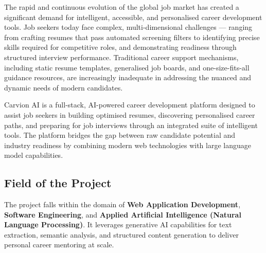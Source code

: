 \documentclass[12pt,a4paper]{article}
\begin{document}
The rapid and continuous evolution of the global job market has created a significant demand for intelligent, accessible, and personalised career development tools. Job seekers today face complex, multi-dimensional challenges --- ranging from crafting resumes that pass automated screening filters to identifying precise skills required for competitive roles, and demonstrating readiness through structured interview performance. Traditional career support mechanisms, including static resume templates, generalised job boards, and one-size-fits-all guidance resources, are increasingly inadequate in addressing the nuanced and dynamic needs of modern candidates.

Carvion AI is a full-stack, AI-powered career development platform designed to assist job seekers in building optimised resumes, discovering personalised career paths, and preparing for job interviews through an integrated suite of intelligent tools. The platform bridges the gap between raw candidate potential and industry readiness by combining modern web technologies with large language model capabilities.

\subsection{Field of the Project}
The project falls within the domain of \textbf{Web Application Development}, \textbf{Software Engineering}, and \textbf{Applied Artificial Intelligence (Natural Language Processing)}. It leverages generative AI capabilities for text extraction, semantic analysis, and structured content generation to deliver personal career mentoring at scale.
\end{document}
